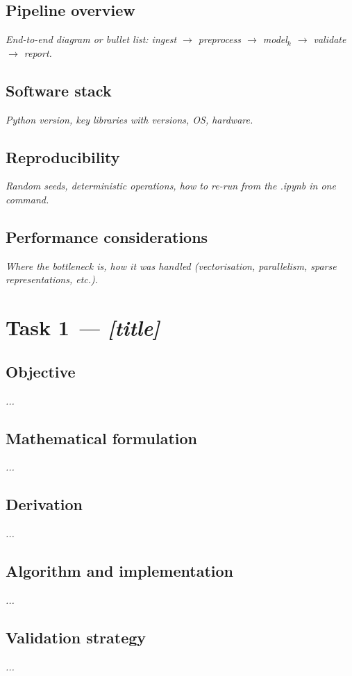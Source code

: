 \documentclass[12pt,a4paper]{article}
\newcommand{\ph}[1]{\textit{\textcolor{phgray}{#1}}}
\begin{document}
\subsection{Pipeline overview}
\ph{End-to-end diagram or bullet list: ingest $\to$ preprocess $\to$ model$_k$ $\to$ validate $\to$ report.}

\subsection{Software stack}
\ph{Python version, key libraries with versions, OS, hardware.}

\subsection{Reproducibility}
\ph{Random seeds, deterministic operations, how to re-run from the .ipynb in one command.}

\subsection{Performance considerations}
\ph{Where the bottleneck is, how it was handled (vectorisation, parallelism, sparse representations, etc.).}

\section{Task 1 \ph{— [title]}}
\subsection{Objective}\ph{...}
\subsection{Mathematical formulation}\ph{...}
\subsection{Derivation}\ph{...}
\subsection{Algorithm and implementation}\ph{...}
\subsection{Validation strategy}\ph{...}
\end{document}
